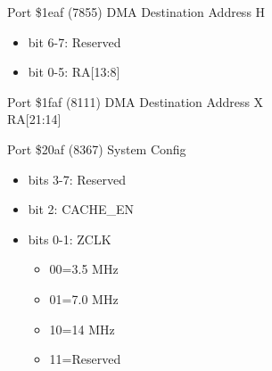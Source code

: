 Port \$1eaf (7855) DMA Destination Address H
\begin{itemize}
\item[] bit 6-7: Reserved
\item[] bit 0-5: RA[13:8]
\end{itemize}

Port \$1faf (8111) DMA Destination Address X\\
RA[21:14]

Port \$20af (8367) System Config
\begin{itemize}
\item[] bits 3-7: Reserved
\item[] bit 2: CACHE\_EN
\item[] bits 0-1: ZCLK
  \begin{itemize}
  \item[] 00=3.5 MHz
  \item[] 01=7.0 MHz
  \item[] 10=14 MHz
  \item[] 11=Reserved
  \end{itemize}
\end{itemize}

